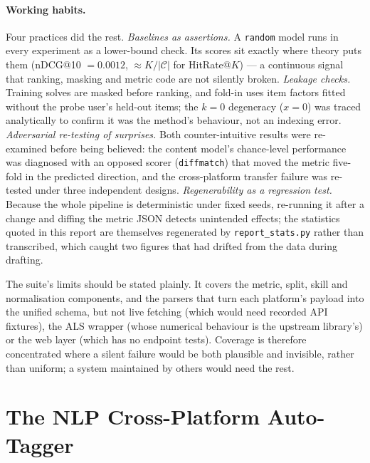 \documentclass[12pt,a4paper]{article}
\newcommand{\ndcg}{nDCG}
\begin{document}
\paragraph{Working habits.} Four practices did the rest.
\emph{Baselines as assertions.} A \texttt{random} model runs in every experiment as a
lower-bound check. Its scores sit exactly where theory puts them (\ndcg{}@10 $=0.0012$,
$\approx K/|\mathcal{C}|$ for HitRate@$K$) --- a continuous signal that ranking, masking
and metric code are not silently broken. \emph{Leakage checks.} Training solves are
masked before ranking, and fold-in uses item factors fitted without the probe user's
held-out items; the $k=0$ degeneracy ($x=0$) was traced analytically to confirm it was
the method's behaviour, not an indexing error. \emph{Adversarial re-testing of
surprises.} Both counter-intuitive results were re-examined before being believed: the
content model's chance-level performance was diagnosed with an opposed scorer
(\texttt{diffmatch}) that moved the metric five-fold in the predicted direction, and the
cross-platform transfer failure was re-tested under three independent designs. \emph{Regenerability as a regression test.} Because the
whole pipeline is deterministic under fixed seeds, re-running it after a change and
diffing the metric JSON detects unintended effects; the statistics quoted in this report
are themselves regenerated by \texttt{report\_stats.py} rather than transcribed, which
caught two figures that had drifted from the data during drafting.

The suite's limits should be stated plainly. It covers the metric, split, skill and
normalisation components, and the parsers that turn each platform's payload into the
unified schema, but not live fetching (which would need recorded API fixtures), the ALS
wrapper (whose numerical behaviour is the upstream library's) or the web layer (which has
no endpoint tests). Coverage is therefore concentrated where a silent failure would be both plausible and
invisible, rather than uniform; a system maintained by others would need the rest.

\section[The NLP Cross-Platform Auto-Tagger \textnormal{\small(755 words)}]{The NLP Cross-Platform Auto-Tagger}
\label{sec:tagger}
\end{document}
